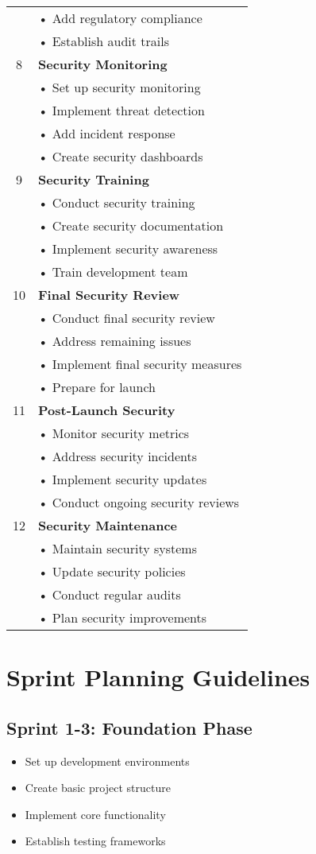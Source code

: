 \documentclass{article}
\begin{document}
\begin{longtable}{|c|p{}|}
& • Add regulatory compliance\\
& • Establish audit trails\\
\hline
8 & \textbf{Security Monitoring}\\
& • Set up security monitoring\\
& • Implement threat detection\\
& • Add incident response\\
& • Create security dashboards\\
\hline
9 & \textbf{Security Training}\\
& • Conduct security training\\
& • Create security documentation\\
& • Implement security awareness\\
& • Train development team\\
\hline
10 & \textbf{Final Security Review}\\
& • Conduct final security review\\
& • Address remaining issues\\
& • Implement final security measures\\
& • Prepare for launch\\
\hline
11 & \textbf{Post-Launch Security}\\
& • Monitor security metrics\\
& • Address security incidents\\
& • Implement security updates\\
& • Conduct ongoing security reviews\\
\hline
12 & \textbf{Security Maintenance}\\
& • Maintain security systems\\
& • Update security policies\\
& • Conduct regular audits\\
& • Plan security improvements\\
\hline
\end{longtable}

\section*{Sprint Planning Guidelines}

\subsection*{Sprint 1-3: Foundation Phase}
\begin{itemize}
    \item Set up development environments
    \item Create basic project structure
    \item Implement core functionality
    \item Establish testing frameworks
\end{itemize}
\end{document}
